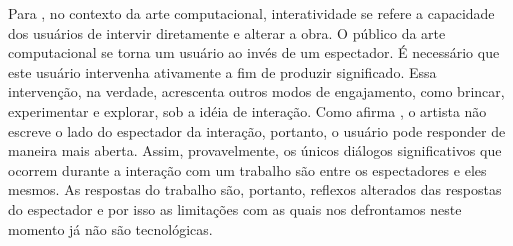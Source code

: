 Para , no contexto da arte computacional, interatividade se refere a capacidade dos usuários de intervir diretamente e alterar a obra. O público da arte computacional se torna um usuário ao invés de um espectador. É necessário que este usuário intervenha ativamente a fim de produzir significado. Essa intervenção, na verdade, acrescenta outros modos de engajamento, como brincar, experimentar e explorar, sob a idéia de interação. Como afirma , o artista não escreve o lado do espectador da interação, portanto, o usuário pode responder de maneira mais aberta. Assim, provavelmente, os únicos diálogos significativos que ocorrem durante a interação com um trabalho são entre os espectadores e eles mesmos. As respostas do trabalho são, portanto, reflexos alterados das respostas do espectador e por isso as limitações com as quais nos defrontamos neste momento já não são tecnológicas.
